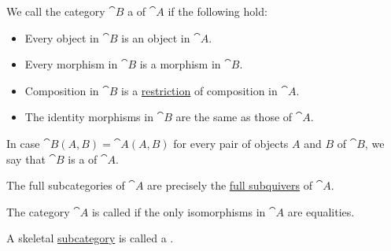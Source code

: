 \begin{definition}\label{def:subcategory}
  We call the category \( \cat{B} \) a  of \( \cat{A} \) if the following hold:
  \begin{itemize}
    \item Every object in \( \cat{B} \) is an object in \( \cat{A} \).
    \item Every morphism in \( \cat{B} \) is a morphism in \( \cat{B} \).
    \item Composition in \( \cat{B} \) is a \hyperref[def:multi_valued_function/restriction]{restriction} of composition in \( \cat{A} \).
    \item The identity morphisms in \( \cat{B} \) are the same as those of \( \cat{A} \).
  \end{itemize}

  In case \( \cat{B}(A, B) = \cat{A}(A, B) \) for every pair of objects \( A \) and \( B \) of \( \cat{B} \), we say that \( \cat{B} \) is a  of \( \cat{A} \).

  The full subcategories of \( \cat{A} \) are precisely the \hyperref[eq:def:theory_of_graphs/submodel/full]{full subquivers} of \( \cat{A} \).
\end{definition}

\begin{definition}\label{def:skeletal_category}
  The category \( \cat{A} \) is called  if the only isomorphisms in \( \cat{A} \) are equalities.

  A skeletal \hyperref[def:subcategory]{subcategory} is called a .
\end{definition}

